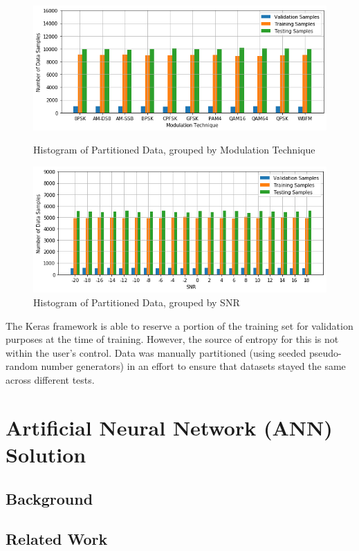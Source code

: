 \documentclass[journal,onecolumn]{IEEEtran}
\begin{document}
\begin{figure}[h]
	\centering
	\includegraphics[scale=0.6]{stratSampleModTech}
	\caption{Histogram of Partitioned Data, grouped by Modulation Technique}
	\includegraphics[scale=0.6]{stratSampleSNR}
	\caption{Histogram of Partitioned Data, grouped by SNR}		
\end{figure}

The Keras framework is able to reserve a portion of the training set for validation purposes at the time of training. However, the source of entropy for this is not within the user's control. Data was manually partitioned (using seeded pseudo-random number generators) in an effort to ensure that datasets stayed the same across different tests.

\section{Artificial Neural Network (ANN) Solution}

\subsection{Background}

\subsection{Related Work}
\end{document}
